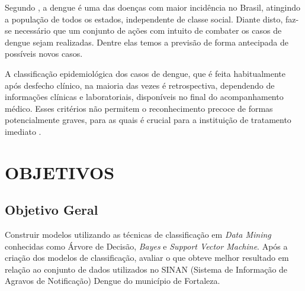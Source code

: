 \documentclass[
	12pt,				%
	openright,			%
	oneside,	
	a4paper,				%
	english,				%
	brazil				%
]{abntex2/abntex2} %
\begin{document}
		Segundo \cite{saude:2013}, a dengue é uma das doenças com maior incidência no Brasil, atingindo a população de todos os estados, independente de classe social. Diante disto, faz-se necessário que um conjunto de ações com intuito de combater os casos de dengue sejam realizadas. Dentre elas temos a previsão de forma antecipada de possíveis novos casos.
	
		A classificação epidemiológica dos casos de dengue, que é feita habitualmente após desfecho clínico, na maioria das vezes é retrospectiva, dependendo de informações clínicas e laboratoriais, disponíveis no final do acompanhamento médico. Esses critérios não permitem o reconhecimento precoce de formas potencialmente graves, para as quais é crucial para a instituição de tratamento imediato \cite{saude:2013}.
		\vspace{-1.5\baselineskip}
	\section{OBJETIVOS}
	
		\subsection{Objetivo Geral}
		\vspace{1\baselineskip}	
		Construir modelos utilizando as técnicas de classificação em \textit{Data Mining} conhecidas como Árvore de Decisão, \textit{Bayes} e \textit{Support Vector Machine}. Após a criação dos modelos de classificação, avaliar o que obteve melhor resultado em relação ao conjunto de dados utilizados no SINAN (Sistema de Informação de Agravos de Notificação) Dengue do município de Fortaleza. 
		\vspace{-1.5\baselineskip}
\end{document}
